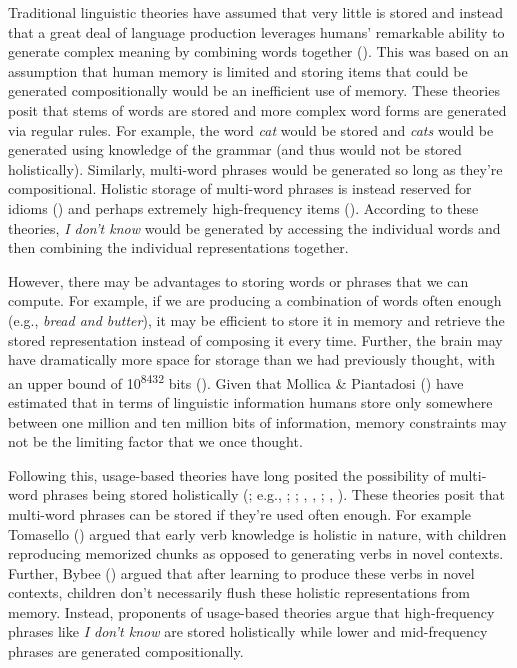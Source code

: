 \documentclass[
  12pt,
  letterpaper,
]{scrreprt}
\begin{document}
Traditional linguistic theories have assumed that very little is stored
and instead that a great deal of language production leverages humans'
remarkable ability to generate complex meaning by combining words
together (). This was based on
an assumption that human memory is limited and storing items that could
be generated compositionally would be an inefficient use of memory.
These theories posit that stems of words are stored and more complex
word forms are generated via regular rules. For example, the word
\emph{cat} would be stored and \emph{cats} would be generated using
knowledge of the grammar (and thus would not be stored holistically).
Similarly, multi-word phrases would be generated so long as they're
compositional. Holistic storage of multi-word phrases is instead
reserved for idioms () and
perhaps extremely high-frequency items (). According to these theories, \emph{I don't know}
would be generated by accessing the individual words and then combining
the individual representations together.

However, there may be advantages to storing words or phrases that we can
compute. For example, if we are producing a combination of words often
enough (e.g., \emph{bread and butter}), it may be efficient to store it
in memory and retrieve the stored representation instead of composing it
every time. Further, the brain may have dramatically more space for
storage than we had previously thought, with an upper bound of
10\textsuperscript{8432} bits
().
Given that Mollica \& Piantadosi
() have estimated
that in terms of linguistic information humans store only somewhere
between one million and ten million bits of information, memory
constraints may not be the limiting factor that we once thought.

Following this, usage-based theories have long posited the possibility
of multi-word phrases being stored holistically
(; e.g.,
;
;
,
,
;
,
). These theories
posit that multi-word phrases can be stored if they're used often
enough. For example Tomasello
()
argued that early verb knowledge is holistic in nature, with children
reproducing memorized chunks as opposed to generating verbs in novel
contexts. Further, Bybee () argued that
after learning to produce these verbs in novel contexts, children don't
necessarily flush these holistic representations from memory. Instead,
proponents of usage-based theories argue that high-frequency phrases
like \emph{I don't know} are stored holistically while lower and
mid-frequency phrases are generated compositionally.
\end{document}
